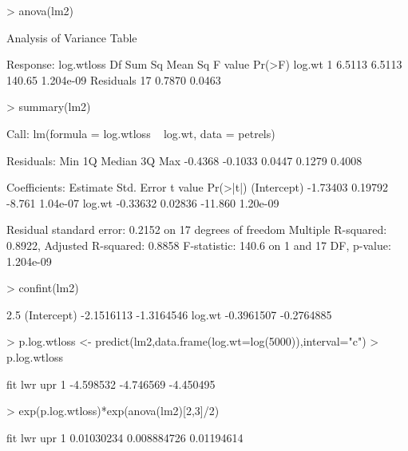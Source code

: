 \documentclass[a4paper]{article}
\begin{document}
\begin{Schunk}
\begin{Sinput}
> anova(lm2)
\end{Sinput}
\begin{Soutput}
Analysis of Variance Table

Response: log.wtloss
          Df Sum Sq Mean Sq F value    Pr(>F)
log.wt     1 6.5113  6.5113  140.65 1.204e-09
Residuals 17 0.7870  0.0463                  
\end{Soutput}
\begin{Sinput}
> summary(lm2)
\end{Sinput}
\begin{Soutput}
Call:
lm(formula = log.wtloss ~ log.wt, data = petrels)

Residuals:
    Min      1Q  Median      3Q     Max 
-0.4368 -0.1033  0.0447  0.1279  0.4008 

Coefficients:
            Estimate Std. Error t value Pr(>|t|)
(Intercept) -1.73403    0.19792  -8.761 1.04e-07
log.wt      -0.33632    0.02836 -11.860 1.20e-09

Residual standard error: 0.2152 on 17 degrees of freedom
Multiple R-squared: 0.8922,	Adjusted R-squared: 0.8858 
F-statistic: 140.6 on 1 and 17 DF,  p-value: 1.204e-09 
\end{Soutput}
\begin{Sinput}
> confint(lm2)
\end{Sinput}
\begin{Soutput}
                 2.5 %     97.5 %
(Intercept) -2.1516113 -1.3164546
log.wt      -0.3961507 -0.2764885
\end{Soutput}
\begin{Sinput}
> p.log.wtloss <- predict(lm2,data.frame(log.wt=log(5000)),interval="c")
> p.log.wtloss
\end{Sinput}
\begin{Soutput}
        fit       lwr       upr
1 -4.598532 -4.746569 -4.450495
\end{Soutput}
\begin{Sinput}
> exp(p.log.wtloss)*exp(anova(lm2)[2,3]/2)
\end{Sinput}
\begin{Soutput}
         fit         lwr        upr
1 0.01030234 0.008884726 0.01194614
\end{Soutput}
\end{Schunk}
\end{document}
